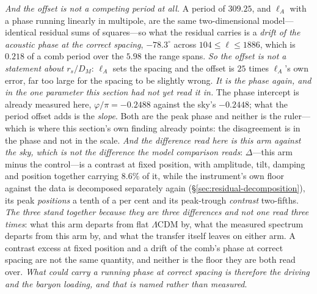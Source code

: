 \documentclass[11pt,a4paper]{article}
\theoremstyle{plain}
\theoremstyle{definition}
\theoremstyle{remark}
\begin{document}
\emph{And the offset is not a competing period at all.} A period of $309.25$, and $\ell_{A}$ with a phase
running linearly in multipole, are the same two-dimensional model---identical residual sums of squares---so
what the residual carries is a \emph{drift of the acoustic phase at the correct spacing}, $-78.3^{\circ}$
across $104\le\ell\le1886$, which is $0.218$ of a comb period over the $5.98$ the range spans.
\emph{So the offset is not a statement about $r_s/D_M$}: $\ell_{A}$ sets the spacing and the offset is
$25$ times $\ell_{A}$'s own error, far too large for the spacing to be slightly wrong. \emph{It is the
phase again, and in the one parameter this section had not yet read it in.} The phase intercept is already
measured here, $\varphi/\pi=-0.2488$ against the sky's $-0.2448$; what the period offset adds is the
\emph{slope}. Both are the peak phase and neither is the ruler---which is where this section's own finding
already points: the disagreement is in the phase and not in the scale. \emph{And the difference read here is
this arm against the sky, which is not the difference the model comparison reads}: $\Delta$---this arm minus
the control---is a contrast at fixed position, with amplitude, tilt, damping and position together carrying
$8.6\%$ of it, while the instrument's own floor against the data is decomposed separately again
(\S\ref{sec:residual-decomposition}), its peak \emph{positions} a tenth of a per cent and its peak-trough
\emph{contrast} two-fifths. \emph{The three stand together because they are three differences and not one read
three times}: what this arm departs from flat $\Lambda$CDM by, what the measured spectrum departs from this arm
by, and what the transfer itself leaves on either arm. A contrast excess at fixed position and a drift of the
comb's phase at correct spacing are not the same quantity, and neither is the floor they are both read over. \emph{What could carry a running phase at correct spacing is
therefore the driving and the baryon loading, and that is named rather than
measured}.
\end{document}
